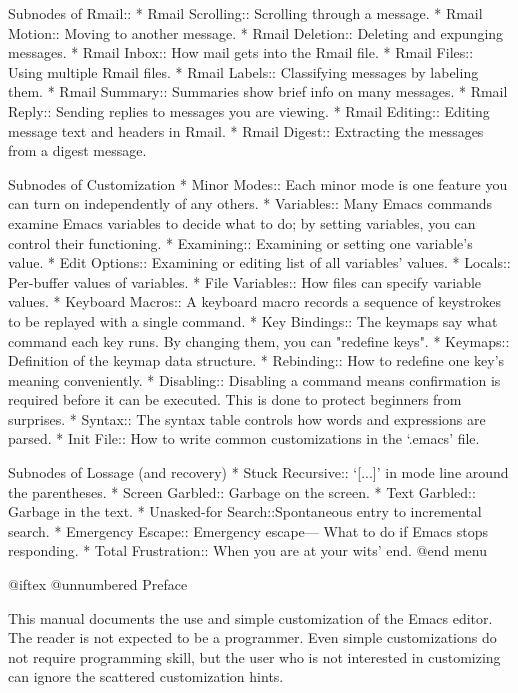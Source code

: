 Subnodes of Rmail::
* Rmail Scrolling::   Scrolling through a message.
* Rmail Motion::      Moving to another message.
* Rmail Deletion::    Deleting and expunging messages.
* Rmail Inbox::       How mail gets into the Rmail file.
* Rmail Files::       Using multiple Rmail files.
* Rmail Labels::      Classifying messages by labeling them.
* Rmail Summary::     Summaries show brief info on many messages.
* Rmail Reply::       Sending replies to messages you are viewing.
* Rmail Editing::     Editing message text and headers in Rmail.
* Rmail Digest::      Extracting the messages from a digest message.

Subnodes of Customization
* Minor Modes::       Each minor mode is one feature you can turn on
                       independently of any others.
* Variables::         Many Emacs commands examine Emacs variables
                       to decide what to do; by setting variables,
                       you can control their functioning.
* Examining::         Examining or setting one variable's value.
* Edit Options::      Examining or editing list of all variables' values.
* Locals::            Per-buffer values of variables.
* File Variables::    How files can specify variable values.
* Keyboard Macros::   A keyboard macro records a sequence of keystrokes
                       to be replayed with a single command.
* Key Bindings::      The keymaps say what command each key runs.
                       By changing them, you can "redefine keys".
* Keymaps::           Definition of the keymap data structure.
* Rebinding::         How to redefine one key's meaning conveniently.
* Disabling::         Disabling a command means confirmation is required
                       before it can be executed.  This is done to protect
                       beginners from surprises.
* Syntax::            The syntax table controls how words and expressions
                       are parsed.
* Init File::         How to write common customizations in the `.emacs' file.

Subnodes of Lossage (and recovery)
* Stuck Recursive::   `[...]' in mode line around the parentheses.
* Screen Garbled::    Garbage on the screen.
* Text Garbled::      Garbage in the text.
* Unasked-for Search::Spontaneous entry to incremental search.
* Emergency Escape::  Emergency escape---
                       What to do if Emacs stops responding.
* Total Frustration:: When you are at your wits' end.
@end menu

@iftex
@unnumbered Preface

  This manual documents the use and simple customization of the
Emacs editor.  The reader is not expected to be a programmer.  Even simple
customizations do not require programming skill, but the user who is not
interested in customizing can ignore the scattered customization hints.

